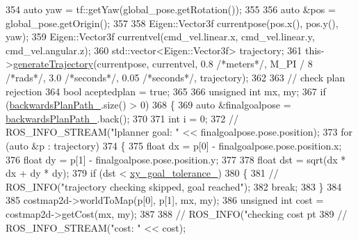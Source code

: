 \begin{DoxyCode}
{354     \textcolor{keyword}{auto} yaw = tf::getYaw(global\_pose.getRotation());
355 
356     \textcolor{keyword}{auto} &pos = global\_pose.getOrigin();
357 
358     Eigen::Vector3f currentpose(pos.x(), pos.y(), yaw);
359     Eigen::Vector3f currentvel(cmd\_vel.linear.x, cmd\_vel.linear.y, cmd\_vel.angular.z);
360     std::vector<Eigen::Vector3f> trajectory;
361     this->\hyperlink{classmove__base__z__client_1_1backward__local__planner_1_1BackwardLocalPlanner_a5da53f29e43639a9af5ba3b640e6bf8c}{generateTrajectory}(currentpose, currentvel, 0.8 \textcolor{comment}{/*meters*/}, M\_PI / 8 \textcolor{comment}{/*rads*/}, 
      3.0 \textcolor{comment}{/*seconds*/}, 0.05 \textcolor{comment}{/*seconds*/}, trajectory);
362 
363     \textcolor{comment}{// check plan rejection}
364     \textcolor{keywordtype}{bool} aceptedplan = \textcolor{keyword}{true};
365 
366     \textcolor{keywordtype}{unsigned} \textcolor{keywordtype}{int} mx, my;
367     \textcolor{keywordflow}{if} (\hyperlink{classmove__base__z__client_1_1backward__local__planner_1_1BackwardLocalPlanner_a451add2af7d6d83a7415277311b3ed04}{backwardsPlanPath\_}.size() > 0)
368     \{
369         \textcolor{keyword}{auto} &finalgoalpose = \hyperlink{classmove__base__z__client_1_1backward__local__planner_1_1BackwardLocalPlanner_a451add2af7d6d83a7415277311b3ed04}{backwardsPlanPath\_}.back();
370 
371         \textcolor{keywordtype}{int} i = 0;
372         \textcolor{comment}{// ROS\_INFO\_STREAM("lplanner goal: " << finalgoalpose.pose.position);}
373         \textcolor{keywordflow}{for} (\textcolor{keyword}{auto} &p : trajectory)
374         \{
375             \textcolor{keywordtype}{float} dx = p[0] - finalgoalpose.pose.position.x;
376             \textcolor{keywordtype}{float} dy = p[1] - finalgoalpose.pose.position.y;
377 
378             \textcolor{keywordtype}{float} dst = sqrt(dx * dx + dy * dy);
379             \textcolor{keywordflow}{if} (dst < \hyperlink{classmove__base__z__client_1_1backward__local__planner_1_1BackwardLocalPlanner_a89ab1ee7283a474dc19970789f51c087}{xy\_goal\_tolerance\_})
380             \{
381                 \textcolor{comment}{//  ROS\_INFO("trajectory checking skipped, goal reached");}
382                 \textcolor{keywordflow}{break};
383             \}
384 
385             costmap2d->worldToMap(p[0], p[1], mx, my);
386             \textcolor{keywordtype}{unsigned} \textcolor{keywordtype}{int} cost = costmap2d->getCost(mx, my);
387 
388             \textcolor{comment}{// ROS\_INFO("checking cost pt %
389             \textcolor{comment}{// ROS\_INFO\_STREAM("cost: " << cost);}
}}
\end{DoxyCode}
